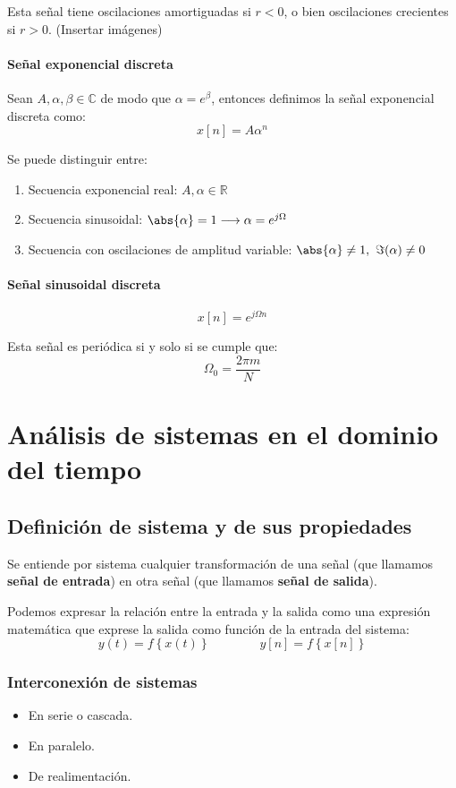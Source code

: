 \documentclass[a4paper]{book}
\begin{document}
Esta señal tiene oscilaciones amortiguadas si $r<0$, o bien oscilaciones crecientes si $r>0$. (Insertar imágenes)

\subsubsection{Señal exponencial discreta}
Sean $A,\alpha ,\beta \in \mathbb{C}$ de modo que $\alpha = e^\beta $, entonces definimos la señal exponencial discreta como: \[x[n] = A\alpha ^n\]

Se puede distinguir entre:
\begin{enumerate}
	\item Secuencia exponencial real: $A, \alpha \in \mathbb{R}$
	\item Secuencia sinusoidal: $\abs{\alpha} = 1 \longrightarrow \alpha = e^{j\Omega}$
	\item Secuencia con oscilaciones de amplitud variable: $\abs{\alpha} \not =1,\ \Im(\alpha) \not =0$
\end{enumerate}

\subsubsection{Señal sinusoidal discreta}
\[x[n] = e^{j\Omega n}\]

Esta señal es periódica si y solo si se cumple que: \[\Omega _0 = \frac{2\pi m}{N}\]

\chapter{Análisis de sistemas en el dominio del tiempo}

\section{Definición de sistema y de sus propiedades}
Se entiende por sistema cualquier transformación de una señal (que llamamos \textbf{señal de entrada}) en otra señal (que llamamos \textbf{señal de salida}).

Podemos expresar la relación entre la entrada y la salida como una expresión matemática que exprese la salida como función de la entrada del sistema:
\[y(t) = f\left\lbrace x(t) \right\rbrace \qquad \qquad y[n] = f\left\lbrace x[n] \right\rbrace\]

\subsection{Interconexión de sistemas}
\begin{itemize}
	\item En serie o cascada.
	\item En paralelo.
	\item De realimentación.
\end{itemize}
\end{document}
